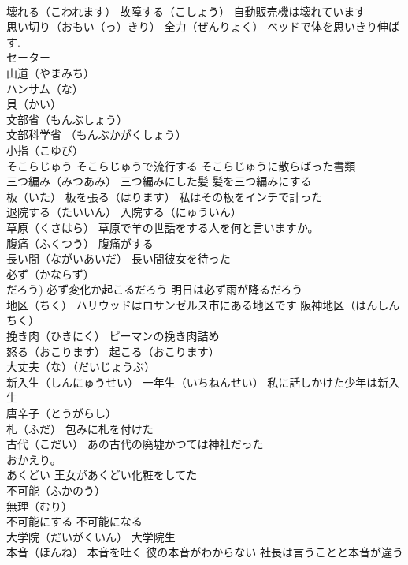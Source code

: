\documentclass[8pt]{extreport}
\begin{document}
\begin{CJK}{UTF8}{min}
\\	壊れる（こわれます） 故障する（こしょう） 自動販売機は壊れています
\\	思い切り（おもい（っ）きり） 全力（ぜんりょく） ベッドで体を思いきり伸ばす.
\\	セーター
\\	山道（やまみち）
\\	ハンサム（な）
\\	貝（かい）
\\	文部省（もんぶしょう）
\\	文部科学省 （もんぶかがくしょう）
\\	小指（こゆび）
\\	そこらじゅう そこらじゅうで流行する そこらじゅうに散らばった書類
\\	三つ編み（みつあみ） 三つ編みにした髪 髪を三つ編みにする
\\	板（いた） 板を張る（はります） 私はその板をインチで計った
\\	退院する（たいいん） 入院する（にゅういん）
\\	草原（くさはら） 草原で羊の世話をする人を何と言いますか。
\\	腹痛（ふくつう） 腹痛がする
\\	長い間（ながいあいだ） 長い間彼女を待った
\\	必ず（かならず）
\\	だろう) 必ず変化か起こるだろう 明日は必ず雨が降るだろう
\\	地区（ちく） ハリウッドはロサンゼルス市にある地区です 阪神地区（はんしんちく）
\\	挽き肉（ひきにく） ピーマンの挽き肉詰め
\\	怒る（おこります） 起こる（おこります）
\\	大丈夫（な）（だいじょうぶ）
\\	新入生（しんにゅうせい） 一年生（いちねんせい） 私に話しかけた少年は新入生
\\	唐辛子（とうがらし）
\\	札（ふだ） 包みに札を付けた
\\	古代（こだい） あの古代の廃墟かつては神社だった
\\	おかえり。
\\	あくどい 王女があくどい化粧をしてた
\\	不可能（ふかのう）
\\	無理（むり）
\\	不可能にする 不可能になる
\\	大学院（だいがくいん） 大学院生
\\	本音（ほんね） 本音を吐く 彼の本音がわからない 社長は言うことと本音が違う

\end{CJK}
\end{document}
